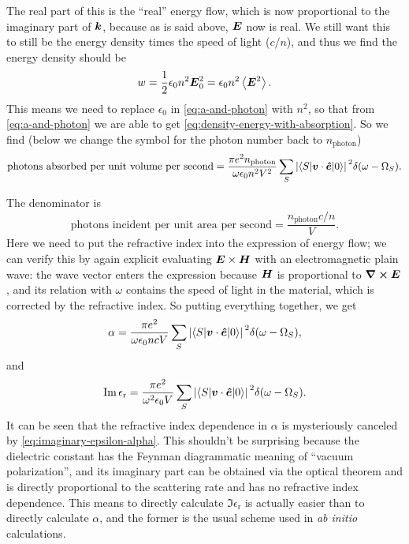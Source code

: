 \documentclass[hyperref, a4paper, 12pt]{report}
\newcommand*{\abinitio}{\textit{ab initio}}
\newcommand*{\epsr}{\epsilon_{\text{r}}}
\begin{document}
The real part of this is the ``real'' energy flow,
which is now proportional to the imaginary part of $\vb*{k}$, 
because as is said above, $\vb*{E}$ now is real.
We still want this to still be 
the energy density times the speed of light ($c / n$),
and thus we find the energy density should be 
\begin{equation}
    w = \frac{1}{2} \epsilon_0 n^2 \vb*{E}_0^2 = \epsilon_0 n^2 \expval{\vb*{E}^2}.
    \label{eq:density-energy-with-absorption}
\end{equation}
This means we need to replace $\epsilon_0$ in \eqref{eq:a-and-photon}
with $n^2$,
so that from \eqref{eq:a-and-photon} we are able to get \eqref{eq:density-energy-with-absorption}.
So we find (below we change the symbol for the photon number 
back to $n_{\text{photon}}$)
\begin{equation}
    \text{photons absorbed per unit volume per second} 
    = \frac{\pi e^2 n_{\text{photon}}}{\omega \epsilon_0 n^2 V^2} 
    \sum_S \abs*{\mel**{S}{\vb*{v} \cdot \vu*{e}}{0}}^2 \delta(\omega - \Omega_S).
\end{equation}

The denominator is 
\[
    \text{photons incident per unit area per second} = \frac{n_{\text{photon}} c / n}{V}.
\]
Here we need to put the refractive index into 
the expression of energy flow;
we can verify this by again explicit evaluating $\vb*{E} \times \vb*{H}$
with an electromagnetic plain wave: 
the wave vector enters the expression 
because $\vb*{H}$ is proportional to $\curl{\vb*{E}}$,
and its relation with $\omega$ contains 
the speed of light in the material,
which is corrected by the refractive index.
So putting everything together, we get 
\begin{equation}
    \alpha = \frac{\pi e^2}{\omega \epsilon_0 n c V} \sum_S \abs*{\mel**{S}{\vb*{v} \cdot \vu*{e}}{0}}^2 \delta(\omega - \Omega_S),
\end{equation}
and 
\begin{equation}
    \Im \epsr = \frac{\pi e^2}{\omega^2 \epsilon_0 V} 
        \sum_S \abs*{\mel**{S}{\vb*{v} \cdot \vu*{e}}{0}}^2 \delta(\omega - \Omega_S).
    \label{eq:light-matter.epsilon-img}
\end{equation}
It can be seen that the refractive index dependence in $\alpha$ 
is mysteriously canceled by \eqref{eq:imaginary-epsilon-alpha}.
This shouldn't be surprising 
because the dielectric constant has the Feynman diagrammatic meaning of 
``vacuum polarization'',
and its imaginary part can be obtained via the optical theorem
and is directly proportional to the scattering rate 
and has no refractive index dependence.
This means to directly calculate $\Im \epsilon_{\text{r}}$ is actually easier 
than to directly calculate $\alpha$,
and the former is the usual scheme used in \abinitio{} calculations.
\end{document}
